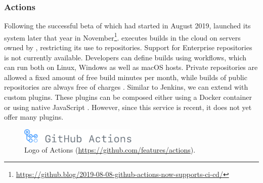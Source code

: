 
\subsubsection{\github{} Actions}\label{sssec:github-actions}
Following the successful beta of \githubactions{} which had started in August 2019, \github{} launched its \CI{} system later that year in November\footnote{\url{https://github.blog/2019-08-08-github-actions-now-supports-ci-cd/}}. \githubactions{} executes builds in the cloud on servers owned by \github{}, restricting its use to \github{} repositories. Support for \github{} Enterprise repositories is not currently available. Developers can define builds using workflows, which can run both on Linux, Windows as well as macOS hosts. Private repositories are allowed a fixed amount of free build minutes per month, while builds of public repositories are always free of charges  \cite{githubactions}. Similar to Jenkins, we can extend \githubactions{} with custom plugins. These plugins can be composed either using a Docker container or using native JavaScript \cite{aboutgithubactions}. However, since this service is recent, it does not yet offer many plugins.

\begin{figure}[htbp!]
	\centering
	\includegraphics[width=0.5\textwidth]{assets/images/github-actions.pdf}
	\caption{Logo of \github{} Actions (\url{https://github.com/features/actions}).}
	\label{fig:github-actions}
\end{figure}
